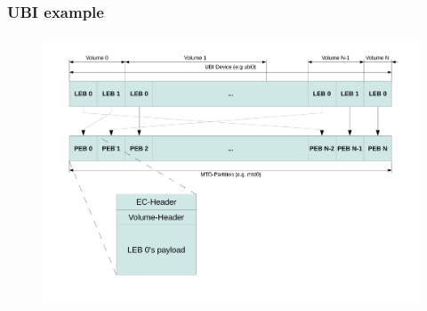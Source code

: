 \documentclass[aspectratio=169,obeyspaces,spaces,hyphens,dvipsnames]{beamer}
\begin{document}
\begin{frame}[fragile]
\frametitle{UBI example}
  \begin{figure}
    \includegraphics[scale=0.33]{ubi-nonfastmap.pdf}
  \end{figure}
\end{frame}
\end{document}
